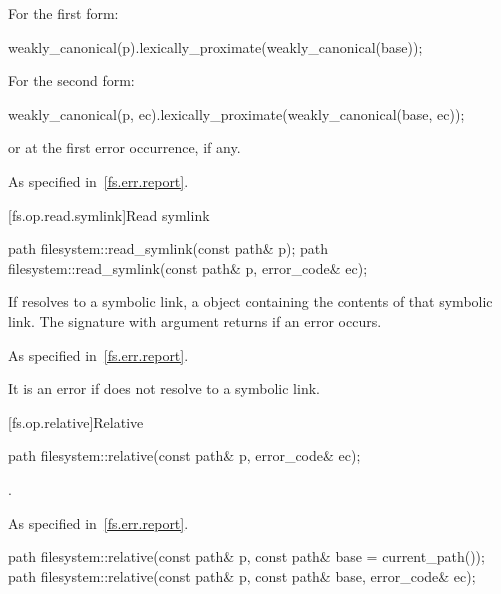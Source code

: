 \begin{itemdescr}
\pnum
\returns
For the first form:
\begin{codeblock}
weakly_canonical(p).lexically_proximate(weakly_canonical(base));
\end{codeblock}
  For the second form:
\begin{codeblock}
weakly_canonical(p, ec).lexically_proximate(weakly_canonical(base, ec));
\end{codeblock}
  or  at the first error occurrence, if any.

\pnum
\throws
As specified in~\ref{fs.err.report}.
\end{itemdescr}

[fs.op.read.symlink]{Read symlink}

%
\begin{itemdecl}
path filesystem::read_symlink(const path& p);
path filesystem::read_symlink(const path& p, error_code& ec);
\end{itemdecl}

\begin{itemdescr}
\pnum
\returns
If  resolves to a symbolic
  link, a  object containing the contents of that symbolic
  link. The signature with argument 
  returns  if an error occurs.

\pnum
\throws
As specified in~\ref{fs.err.report}.
\begin{note}
It is an error if  does not
  resolve to a symbolic link.
\end{note}
\end{itemdescr}

[fs.op.relative]{Relative}

%
\begin{itemdecl}
path filesystem::relative(const path& p, error_code& ec);
\end{itemdecl}

\begin{itemdescr}
\pnum
\returns
{}.

\pnum
\throws
As specified in~\ref{fs.err.report}.
\end{itemdescr}

%
\begin{itemdecl}
path filesystem::relative(const path& p, const path& base = current_path());
path filesystem::relative(const path& p, const path& base, error_code& ec);
\end{itemdecl}

